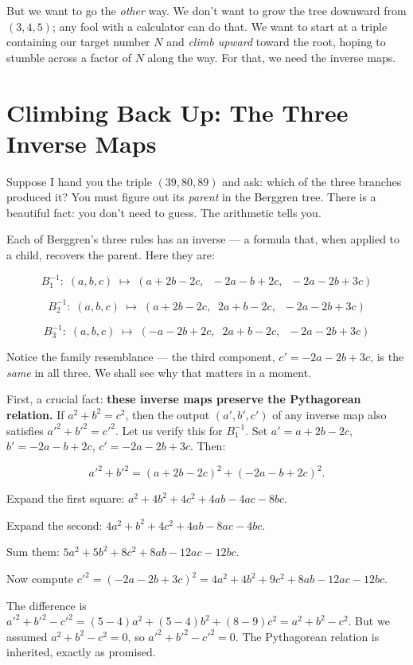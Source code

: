 But we want to go the \textit{other} way. We don't want to grow the tree downward from $(3,4,5)$; any fool with a calculator can do that. We want to start at a triple containing our target number $N$ and \textit{climb upward} toward the root, hoping to stumble across a factor of $N$ along the way. For that, we need the inverse maps.

\bigskip

\section*{Climbing Back Up: The Three Inverse Maps}

Suppose I hand you the triple $(39, 80, 89)$ and ask: which of the three branches produced it? You must figure out its \textit{parent} in the Berggren tree. There is a beautiful fact: you don't need to guess. The arithmetic tells you.

Each of Berggren's three rules has an inverse --- a formula that, when applied to a child, recovers the parent. Here they are:

\[
B_1^{-1}:\; (a,b,c) \;\longmapsto\; (a + 2b - 2c,\;\; -2a - b + 2c,\;\; -2a - 2b + 3c)
\]

\[
B_2^{-1}:\; (a,b,c) \;\longmapsto\; (a + 2b - 2c,\;\; 2a + b - 2c,\;\; -2a - 2b + 3c)
\]

\[
B_3^{-1}:\; (a,b,c) \;\longmapsto\; (-a - 2b + 2c,\;\; 2a + b - 2c,\;\; -2a - 2b + 3c)
\]

Notice the family resemblance --- the third component, $c' = -2a - 2b + 3c$, is the \textit{same} in all three. We shall see why that matters in a moment.

First, a crucial fact: \textbf{these inverse maps preserve the Pythagorean relation.} If $a^2 + b^2 = c^2$, then the output $(a', b', c')$ of any inverse map also satisfies ${a'}^2 + {b'}^2 = {c'}^2$. Let us verify this for $B_1^{-1}$. Set $a' = a + 2b - 2c$, $b' = -2a - b + 2c$, $c' = -2a - 2b + 3c$. Then:

\[
{a'}^2 + {b'}^2 = (a + 2b - 2c)^2 + (-2a - b + 2c)^2.
\]

Expand the first square: $a^2 + 4b^2 + 4c^2 + 4ab - 4ac - 8bc$.

Expand the second: $4a^2 + b^2 + 4c^2 + 4ab - 8ac - 4bc$.

Sum them: $5a^2 + 5b^2 + 8c^2 + 8ab - 12ac - 12bc$.

Now compute ${c'}^2 = (-2a - 2b + 3c)^2 = 4a^2 + 4b^2 + 9c^2 + 8ab - 12ac - 12bc$.

The difference is ${a'}^2 + {b'}^2 - {c'}^2 = (5-4)a^2 + (5-4)b^2 + (8-9)c^2 = a^2 + b^2 - c^2$. But we assumed $a^2 + b^2 - c^2 = 0$, so ${a'}^2 + {b'}^2 - {c'}^2 = 0$. The Pythagorean relation is inherited, exactly as promised.

